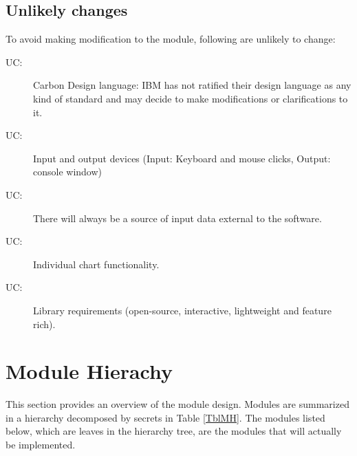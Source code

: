 \documentclass[12pt, titlepage]{article}
\newcounter{ucnum}
\newcommand{\uctheucnum}{UC\theucnum}
\begin{document}
\subsection{Unlikely changes}
To avoid making modification to the module, following are unlikely to change:

\begin{description}
\item[ \uctheucnum \label{ucInput}:]Carbon Design language: IBM has not ratified their design language as any kind of standard and may decide to make modifications or clarifications to it.
\item[ \uctheucnum \label{ucIO}:] Input and output devices (Input: Keyboard and mouse clicks, Output: console window)
\item[ \uctheucnum \label{ucInput}:] There will always be a source of input data external to the software.
\item[ \uctheucnum \label{ucInput}:] Individual chart functionality.
\item[ \uctheucnum \label{ucInput}:] Library requirements (open-source, interactive, lightweight and feature rich).  
\end{description}
\newpage
\section{Module Hierachy}
This section provides an overview of the module design. Modules are summarized in a hierarchy decomposed by secrets in Table \ref{TblMH}. The modules listed below, which are leaves in the hierarchy tree, are the modules that will actually be implemented.
\end{document}
